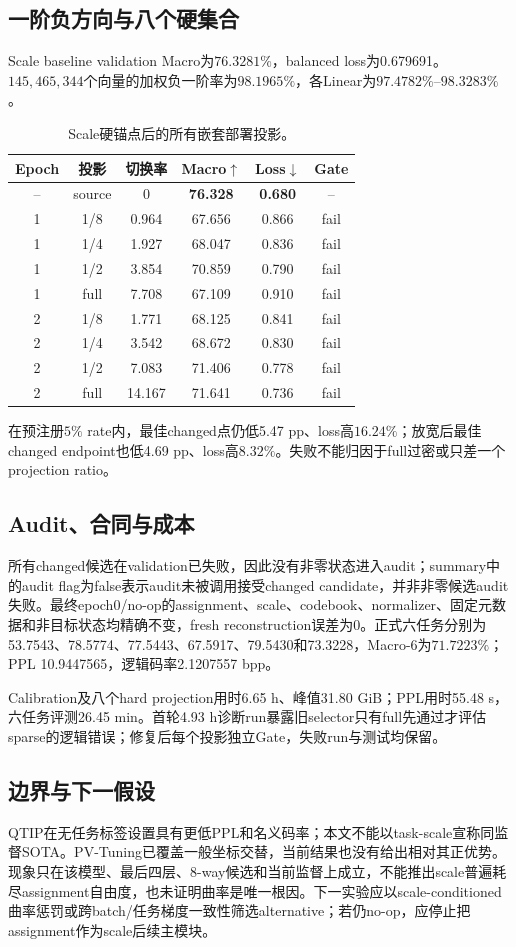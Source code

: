 \subsection{一阶负方向与八个硬集合}
Scale baseline validation Macro为$76.3281\%$，balanced loss为0.679691。$145{,}465{,}344$个向量的加权负一阶率为$98.1965\%$，各Linear为$97.4782\%$--$98.3283\%$。
\begin{table}[t]
\centering
\small
\caption{Scale硬锚点后的所有嵌套部署投影。}
\begin{tabular}{cccccc}
\toprule
Epoch & 投影 & 切换率 & Macro$\uparrow$ & Loss$\downarrow$ & Gate\\
\midrule
-- & source & 0 & \textbf{76.328} & \textbf{0.680} & --\\
1 & 1/8 & 0.964 & 67.656 & 0.866 & fail\\
1 & 1/4 & 1.927 & 68.047 & 0.836 & fail\\
1 & 1/2 & 3.854 & 70.859 & 0.790 & fail\\
1 & full & 7.708 & 67.109 & 0.910 & fail\\
2 & 1/8 & 1.771 & 68.125 & 0.841 & fail\\
2 & 1/4 & 3.542 & 68.672 & 0.830 & fail\\
2 & 1/2 & 7.083 & 71.406 & 0.778 & fail\\
2 & full & 14.167 & 71.641 & 0.736 & fail\\
\bottomrule
\end{tabular}
\end{table}
在预注册$5\%$ rate内，最佳changed点仍低5.47 pp、loss高$16.24\%$；放宽后最佳changed endpoint也低4.69 pp、loss高$8.32\%$。失败不能归因于full过密或只差一个projection ratio。

\subsection{Audit、合同与成本}
所有changed候选在validation已失败，因此没有非零状态进入audit；summary中的audit flag为false表示audit未被调用接受changed candidate，并非非零候选audit失败。最终epoch0/no-op的assignment、scale、codebook、normalizer、固定元数据和非目标状态均精确不变，fresh reconstruction误差为0。正式六任务分别为53.7543、78.5774、77.5443、67.5917、79.5430和73.3228，Macro-6为$71.7223\%$；PPL 10.9447565，逻辑码率2.1207557 bpp。

Calibration及八个hard projection用时6.65 h、峰值31.80 GiB；PPL用时55.48 s，六任务评测26.45 min。首轮4.93 h诊断run暴露旧selector只有full先通过才评估sparse的逻辑错误；修复后每个投影独立Gate，失败run与测试均保留。

\subsection{边界与下一假设}
QTIP在无任务标签设置具有更低PPL和名义码率；本文不能以task-scale宣称同监督SOTA。PV-Tuning已覆盖一般坐标交替，当前结果也没有给出相对其正优势。现象只在该模型、最后四层、8-way候选和当前监督上成立，不能推出scale普遍耗尽assignment自由度，也未证明曲率是唯一根因。下一实验应以scale-conditioned曲率惩罚或跨batch/任务梯度一致性筛选alternative；若仍no-op，应停止把assignment作为scale后续主模块。
